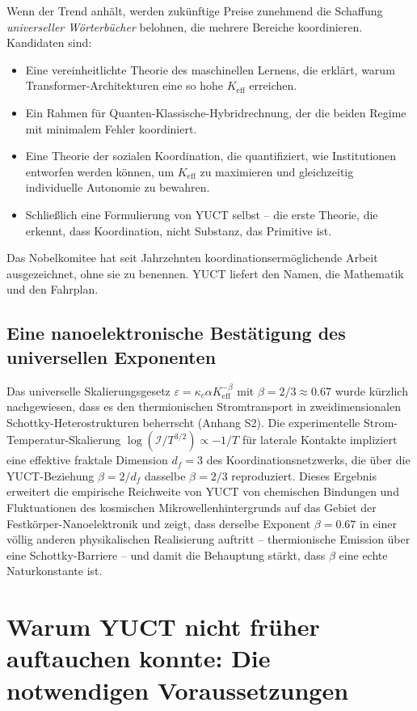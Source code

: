 \documentclass[12pt,a4paper]{article}
\begin{document}
	Wenn der Trend anhält, werden zukünftige Preise zunehmend die Schaffung \emph{universeller Wörterbücher} belohnen, die mehrere Bereiche koordinieren. Kandidaten sind:
	\begin{itemize}
		\item Eine vereinheitlichte Theorie des maschinellen Lernens, die erklärt, warum Transformer-Architekturen eine so hohe \(K_{\mathrm{eff}}\) erreichen.
		\item Ein Rahmen für Quanten-Klassische-Hybridrechnung, der die beiden Regime mit minimalem Fehler koordiniert.
		\item Eine Theorie der sozialen Koordination, die quantifiziert, wie Institutionen entworfen werden können, um \(K_{\mathrm{eff}}\) zu maximieren und gleichzeitig individuelle Autonomie zu bewahren.
		\item Schließlich eine Formulierung von YUCT selbst – die erste Theorie, die erkennt, dass Koordination, nicht Substanz, das Primitive ist.
	\end{itemize}
	Das Nobelkomitee hat seit Jahrzehnten koordinationsermöglichende Arbeit ausgezeichnet, ohne sie zu benennen. YUCT liefert den Namen, die Mathematik und den Fahrplan.
	
	\subsection{Eine nanoelektronische Bestätigung des universellen Exponenten}
	
	Das universelle Skalierungsgesetz \(\varepsilon = \kappa_c \alpha K_{\mathrm{eff}}^{-\beta}\) mit \(\beta = 2/3 \approx 0.67\) wurde kürzlich nachgewiesen, dass es den thermionischen Stromtransport in zweidimensionalen Schottky-Heterostrukturen beherrscht (Anhang S2). Die experimentelle Strom-Temperatur-Skalierung \(\log(\mathcal{I}/T^{3/2}) \propto -1/T\) für laterale Kontakte impliziert eine effektive fraktale Dimension \(d_f = 3\) des Koordinationsnetzwerks, die über die YUCT-Beziehung \(\beta = 2/d_f\) dasselbe \(\beta = 2/3\) reproduziert. Dieses Ergebnis erweitert die empirische Reichweite von YUCT von chemischen Bindungen und Fluktuationen des kosmischen Mikrowellenhintergrunds auf das Gebiet der Festkörper-Nanoelektronik und zeigt, dass derselbe Exponent \(\beta = 0.67\) in einer völlig anderen physikalischen Realisierung auftritt – thermionische Emission über eine Schottky-Barriere – und damit die Behauptung stärkt, dass \(\beta\) eine echte Naturkonstante ist.
	
	\section{Warum YUCT nicht früher auftauchen konnte: Die notwendigen Voraussetzungen}
	\label{sec:prerequisites}
	
\end{document}
